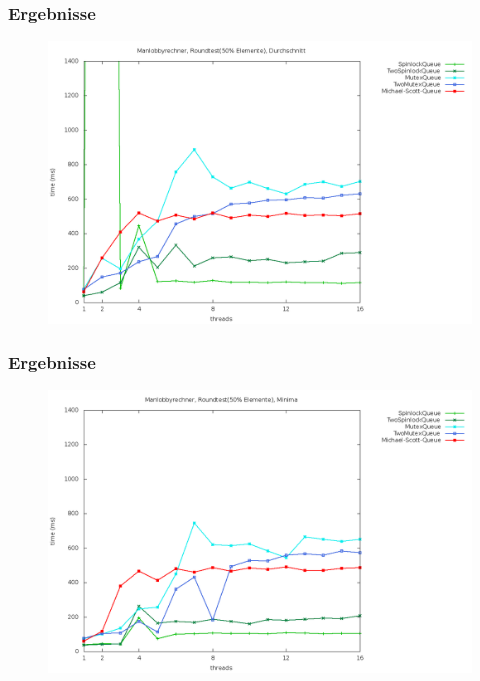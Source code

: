 \documentclass[svgnames]{beamer}
\begin{document}

\begin{frame}
\frametitle{Ergebnisse}
\begin {figure}
      \begin{center}
	\includegraphics[width=\textwidth]{manr1a.png}
     \end{center}
\end {figure}
\end{frame}

\begin{frame}
\frametitle{Ergebnisse}
\begin {figure}
      \begin{center}
	\includegraphics[width=\textwidth]{manr1m.png}
     \end{center}
\end {figure}
\end{frame}
\end{document}
